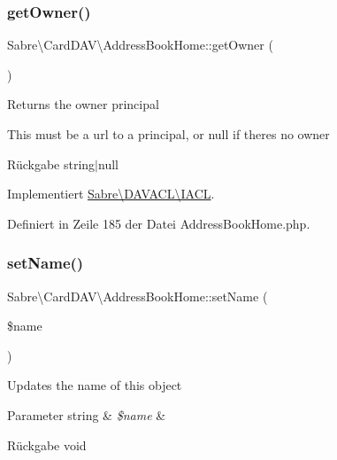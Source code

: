 \subsubsection{\texorpdfstring{get\+Owner()}{getOwner()}}
{\footnotesize\ttfamily Sabre\textbackslash{}\+Card\+D\+A\+V\textbackslash{}\+Address\+Book\+Home\+::get\+Owner (\begin{DoxyParamCaption}{ }\end{DoxyParamCaption})}

Returns the owner principal

This must be a url to a principal, or null if there\textquotesingle{}s no owner

\begin{DoxyReturn}{Rückgabe}
string$\vert$null 
\end{DoxyReturn}


Implementiert \mbox{\hyperlink{interface_sabre_1_1_d_a_v_a_c_l_1_1_i_a_c_l_a05f531b4ae1a86eab4e6e95b0413390e}{Sabre\textbackslash{}\+D\+A\+V\+A\+C\+L\textbackslash{}\+I\+A\+CL}}.



Definiert in Zeile 185 der Datei Address\+Book\+Home.\+php.

\mbox{\label{class_sabre_1_1_card_d_a_v_1_1_address_book_home_a5f10222c82a11fdc8af8b8588b6b957b}} 
\subsubsection{\texorpdfstring{set\+Name()}{setName()}}
{\footnotesize\ttfamily Sabre\textbackslash{}\+Card\+D\+A\+V\textbackslash{}\+Address\+Book\+Home\+::set\+Name (\begin{DoxyParamCaption}\item[{}]{\$name }\end{DoxyParamCaption})}

Updates the name of this object


\begin{DoxyParams}[1]{Parameter}
string & {\em \$name} & \\
\hline
\end{DoxyParams}
\begin{DoxyReturn}{Rückgabe}
void 
\end{DoxyReturn}


